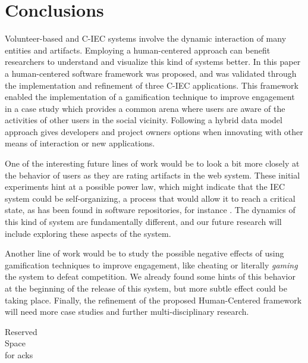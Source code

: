 \section{Conclusions}
\label{sec:conclusions}

Volunteer-based and C-IEC systems involve the dynamic 
interaction of many entities and artifacts. Employing a human-centered approach 
can benefit researchers to understand and visualize this kind of systems better.
In this paper a human-centered software framework was proposed, and was validated
through the implementation and refinement of three C-IEC applications.
This framework enabled the implementation of a gamification technique 
to improve engagement in a case study which provides a common arena where users are aware of the
activities of other users in the social vicinity. Following a hybrid data model approach
gives developers and project owners options when innovating with other means
of interaction or new applications.


One of the interesting future lines of work would be to look a bit
more closely at the behavior of users as they are rating artifacts 
in the web system. These initial experiments hint at a possible power law, which might indicate that
the IEC system could be self-organizing, a process that would allow it
to reach a critical state, as has been found in software repositories,
for instance \cite{Merelo2016:repomining}. 
The dynamics of this kind of system are fundamentally different, and our future research will
include exploring these aspects of the system. 

Another line of work would be to study the possible negative effects of using  
gamification techniques to improve engagement, like cheating or
literally {\em gaming} the system to defeat competition. We already
found some hints of this behavior at the beginning of the release of
this system, but more subtle effect could be taking place. 
Finally, the refinement of the proposed Human-Centered framework will need
more case studies and further multi-disciplinary research. 

\begin{acks}
  Reserved\\
  Space\\
  for acks\\


\end{acks}
